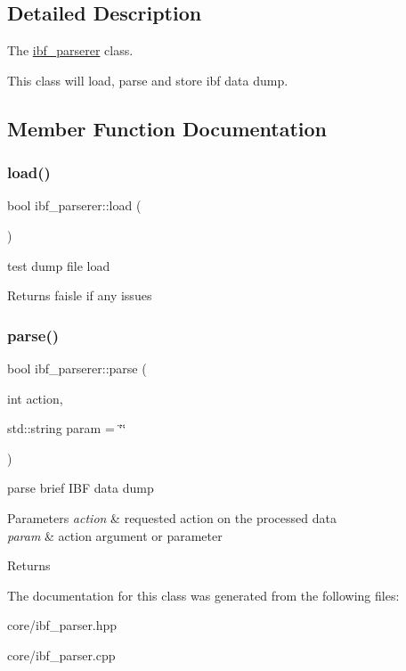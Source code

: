 \subsection{Detailed Description}
The \mbox{\hyperlink{classibf__parserer}{ibf\+\_\+parserer}} class. 

This class will load, parse and store ibf data dump. 

\subsection{Member Function Documentation}
\mbox{\label{classibf__parserer_a630ed53f2480e4b2fc6c7c5b0f4edc07}} 
\subsubsection{\texorpdfstring{load()}{load()}}
{\footnotesize\ttfamily bool ibf\+\_\+parserer\+::load (\begin{DoxyParamCaption}{ }\end{DoxyParamCaption})}



test dump file load 

\begin{DoxyReturn}{Returns}
faisle if any issues 
\end{DoxyReturn}
\mbox{\label{classibf__parserer_a1c1fb0c3f5ca1347264ab1ab4619bf15}} 
\subsubsection{\texorpdfstring{parse()}{parse()}}
{\footnotesize\ttfamily bool ibf\+\_\+parserer\+::parse (\begin{DoxyParamCaption}\item[{int}]{action,  }\item[{std\+::string}]{param = {\ttfamily \char`\"{}\char`\"{}} }\end{DoxyParamCaption})}



parse brief I\+BF data dump 


\begin{DoxyParams}{Parameters}
{\em action} & requested action on the processed data \\
\hline
{\em param} & action argument or parameter \\
\hline
\end{DoxyParams}
\begin{DoxyReturn}{Returns}

\end{DoxyReturn}


The documentation for this class was generated from the following files\+:\begin{DoxyCompactItemize}
\item 
core/ibf\+\_\+parser.\+hpp\item 
core/ibf\+\_\+parser.\+cpp\end{DoxyCompactItemize}
